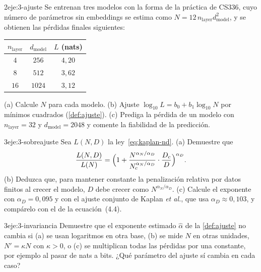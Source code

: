 \begin{ejercicio}{2}{eje:3-ajuste}
Se entrenan tres modelos con la forma de la práctica de CS336, cuyo número de parámetros sin embeddings se estima como $N=12\,n_{\mathrm{layer}}d_{\mathrm{model}}^{2}$, y se obtienen las pérdidas finales siguientes:
\begin{center}\small
\begin{tabular}{@{}ccc@{}}
\toprule
$n_{\mathrm{layer}}$ & $d_{\mathrm{model}}$ & $L$ (nats) \\
\midrule
$4$ & $256$ & $4{,}20$ \\
$8$ & $512$ & $3{,}62$ \\
$16$ & $1024$ & $3{,}12$ \\
\bottomrule
\end{tabular}
\end{center}
(a) Calcule $N$ para cada modelo. (b) Ajuste $\log_{10}L=b_0+b_1\log_{10}N$ por mínimos cuadrados (\cref{def:ajuste}). (c) Prediga la pérdida de un modelo con $n_{\mathrm{layer}}=32$ y $d_{\mathrm{model}}=2048$ y comente la fiabilidad de la predicción.
\end{ejercicio}

\begin{ejercicio}{3}{eje:3-sobreajuste}
Sea $L(N,D)$ la ley~\eqref{eq:kaplan-nd}. (a) Demuestre que
\[
\frac{L(N,D)}{L(N)}=\Bigl(1+\frac{N^{\alpha_N/\alpha_D}}{N_c^{\alpha_N/\alpha_D}}\cdot\frac{D_c}{D}\Bigr)^{\alpha_D}.
\]
(b) Deduzca que, para mantener constante la penalización relativa por datos finitos al crecer el modelo, $D$ debe crecer como $N^{\alpha_N/\alpha_D}$. (c) Calcule el exponente con $\alpha_D=0{,}095$ y con el ajuste conjunto de Kaplan \emph{et al.}, que usa $\alpha_D\approx 0{,}103$, y compárelo con el de la ecuación~(4.4).
\end{ejercicio}

\begin{ejercicio}{3}{eje:3-invariancia}
Demuestre que el exponente estimado $\hat\alpha$ de la \cref{def:ajuste} no cambia si (a) se usan logaritmos en otra base, (b) se mide $N$ en otras unidades, $N'=\kappa N$ con $\kappa>0$, o (c) se multiplican todas las pérdidas por una constante, por ejemplo al pasar de nats a bits. ¿Qué parámetro del ajuste sí cambia en cada caso?
\end{ejercicio}
